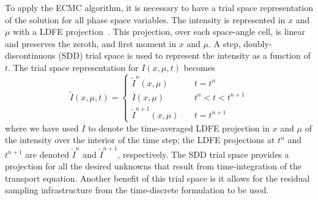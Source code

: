 \documentclass{anstrans}
\begin{document}
To apply the ECMC algorithm, it is necessary to have a trial space representation
of the solution for all phase space variables.  The intensity is represented in $x$ and $\mu$ with a
LDFE projection~\cite{bolding_nse}.  This projection, over each space-angle cell, is linear and preserves the zeroth, and
first moment in $x$ and $\mu$.  A step, doubly-discontinuous (SDD) trial
space is used to represent the intensity as a function of $t$.  The trial space
representation for $I(x,\mu,t)$ becomes 
\begin{equation}\label{eq:time_space}
    \tilde I(x,\mu,t) = \left \{ \begin{array}{cl}
        \tilde I^{n}(x,\mu)  & \quad t = t^n \\ 
        \overline I(x,\mu)  & \quad t^{n} < t <t^{n+1} \\               
      \tilde I^{n+1}(x,\mu)   &  \quad        t = t^{n+1}
    \end{array}           \right.
\end{equation}
where we have used $\overline I$ to denote the time-averaged LDFE projection in $x$
and $\mu$ of the intensity over the interior of the time step;  the LDFE projections at
$t^{n}$ and $t^{n+1}$ are denoted $\tilde I^{n}$ and $\tilde I^{n+1}$, respectively.    
 The SDD trial space provides a
projection for all the desired unknowns that result from time-integration of the transport
equation. Another benefit of this
trial space is it allows for the residual sampling infrastructure from the
time-discrete formulation to be used. 
\end{document}
